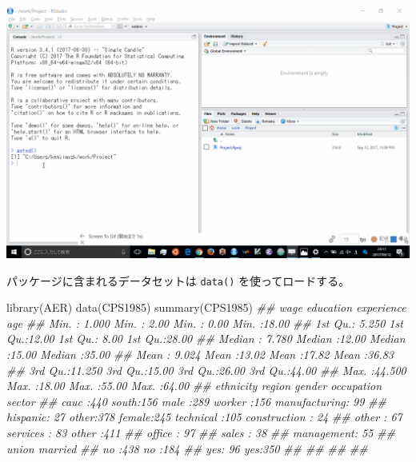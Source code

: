 \documentclass[
  letterpaper,
  xelatex,
  ja=standard, xelatex]{bxjsbook}
\newenvironment{Shaded}{\begin{snugshade}}{\end{snugshade}}
\newcommand{\DocumentationTok}[1]{\textcolor[rgb]{0.37,0.37,0.37}{\textit{#1}}}
\newcommand{\FunctionTok}[1]{\textcolor[rgb]{0.28,0.35,0.67}{#1}}
\newcommand{\NormalTok}[1]{\textcolor[rgb]{0.00,0.23,0.31}{#1}}
\begin{document}
\includegraphics{figs/rstudio_data.gif}

パッケージに含まれるデータセットは \texttt{data()} を使ってロードする。

\begin{Shaded}
\begin{Highlighting}[]
\FunctionTok{library}\NormalTok{(AER)}
\FunctionTok{data}\NormalTok{(CPS1985)}
\FunctionTok{summary}\NormalTok{(CPS1985)}
\DocumentationTok{\#\#       wage          education       experience         age       }
\DocumentationTok{\#\#  Min.   : 1.000   Min.   : 2.00   Min.   : 0.00   Min.   :18.00  }
\DocumentationTok{\#\#  1st Qu.: 5.250   1st Qu.:12.00   1st Qu.: 8.00   1st Qu.:28.00  }
\DocumentationTok{\#\#  Median : 7.780   Median :12.00   Median :15.00   Median :35.00  }
\DocumentationTok{\#\#  Mean   : 9.024   Mean   :13.02   Mean   :17.82   Mean   :36.83  }
\DocumentationTok{\#\#  3rd Qu.:11.250   3rd Qu.:15.00   3rd Qu.:26.00   3rd Qu.:44.00  }
\DocumentationTok{\#\#  Max.   :44.500   Max.   :18.00   Max.   :55.00   Max.   :64.00  }
\DocumentationTok{\#\#     ethnicity     region       gender         occupation            sector   }
\DocumentationTok{\#\#  cauc    :440   south:156   male  :289   worker    :156   manufacturing: 99  }
\DocumentationTok{\#\#  hispanic: 27   other:378   female:245   technical :105   construction : 24  }
\DocumentationTok{\#\#  other   : 67                            services  : 83   other        :411  }
\DocumentationTok{\#\#                                          office    : 97                      }
\DocumentationTok{\#\#                                          sales     : 38                      }
\DocumentationTok{\#\#                                          management: 55                      }
\DocumentationTok{\#\#  union     married  }
\DocumentationTok{\#\#  no :438   no :184  }
\DocumentationTok{\#\#  yes: 96   yes:350  }
\DocumentationTok{\#\#                     }
\DocumentationTok{\#\#                     }
\DocumentationTok{\#\#                     }
\DocumentationTok{\#\# }
\end{Highlighting}
\end{Shaded}
\end{document}
